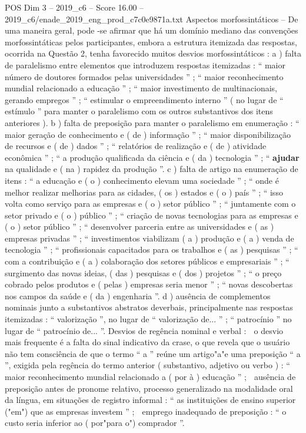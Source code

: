 \begin{textsample}{POS Dim 3 – 2019\_c6 – Score 16.00 – 2019\_c6/enade\_2019\_eng\_prod\_c7c0e9871a.txt}
Aspectos morfossintáticos – De uma maneira geral, pode -se afirmar que há um domínio mediano das convenções morfossintáticas pelos participantes, embora a estrutura itemizada das respostas, ocorrida na Questão 2, tenha favorecido muitos desvios morfossintáticos : a ) falta de paralelismo entre elementos que introduzem respostas itemizadas : “ maior número de doutores formados pelas universidades ” ; “ maior reconhecimento mundial relacionado a educação ” ; “ maior investimento de multinacionais, gerando empregos ” ; “ estimular o empreendimento interno ” ( no lugar de “ estímulo ” para manter o paralelismo com os outros substantivos dos itens anteriores ). b ) falta de preposição para manter o paralelismo em enumeração : “ maior geração de conhecimento e ( de ) informação ” ; “ maior disponibilização de recursos e ( de ) dados ” ; “ relatórios de realização e ( de ) atividade econômica ” ; “ a produção qualificada da ciência e ( da ) tecnologia ” ; “ \textbf{ajudar} na qualidade e ( na ) rapidez da produção ”. c ) falta de artigo na enumeração de itens : “ a educação e ( o ) conhecimento elevam uma sociedade ” ; “ onde é melhor realizar melhorias para as cidades, ( os ) estados e ( o ) país ” ; “ isso volta como serviço para as empresas e ( o ) setor público ” ; “ juntamente com o setor privado e ( o ) público ” ; “ criação de novas tecnologias para as empresas e ( o ) setor público ” ; “ desenvolver parceria entre as universidades e ( as ) empresas privadas ” ; “ investimentos viabilizam ( a ) produção e ( a ) venda de tecnologia ” ; “ profissionais capacitados para os trabalhos e ( as ) pesquisas ” ; “ com a contribuição e ( a ) colaboração dos setores públicos e empresariais ” ; “ surgimento das novas ideias, ( das ) pesquisas e ( dos ) projetos ” ; “ o preço cobrado pelos produtos e ( pelas ) empresas seria menor ” ; “ novas descobertas nos campos da saúde e ( da ) engenharia ”. d ) ausência de complementos nominais junto a substantivos abstratos deverbais, principalmente nas respostas itemizadas : “ valorização ”, no lugar de “ valorização de... ” ; “ patrocínio ” no lugar de “ patrocínio de... ”.
Desvios de regência nominal e verbal :  o desvio mais frequente é a falta do sinal indicativo da crase, o que revela que o usuário não tem consciência de que o termo “ a ” reúne um artigo"a"e uma preposição “ a ”, exigida pela regência do termo anterior ( substantivo, adjetivo ou verbo ) : “ maior reconhecimento mundial relacionado a ( por à ) educação ” ;  ausência de preposição antes de pronome relativo, processo generalizado na modalidade oral da língua, em situações de registro informal : “ as instituições de ensino superior ("em") que as empresas investem ” ;  emprego inadequado de preposição : “ o custo seria inferior ao ( por"para o") comprador ”.

\end{textsample}
